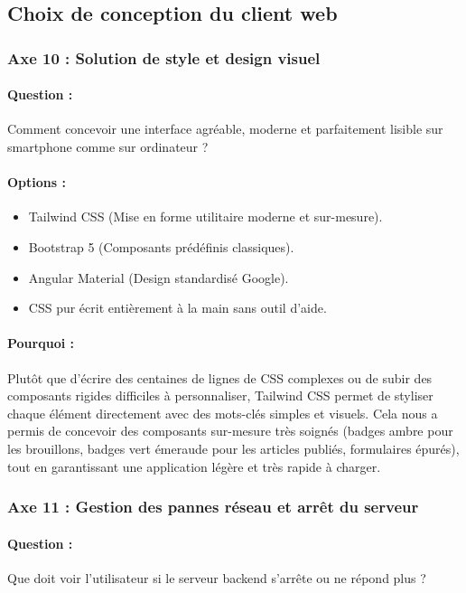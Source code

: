 \documentclass[11pt,a4paper]{article}
\begin{document}
\subsection{Choix de conception du client web}

\subsubsection{Axe 10 : Solution de style et design visuel}
\paragraph{Question :} Comment concevoir une interface agréable, moderne et parfaitement lisible sur smartphone comme sur ordinateur ?
\paragraph{Options :}
\begin{itemize}
    \item[$\boxtimes$] Tailwind CSS (Mise en forme utilitaire moderne et sur-mesure).
    \item[$\square$] Bootstrap 5 (Composants prédéfinis classiques).
    \item[$\square$] Angular Material (Design standardisé Google).
    \item[$\square$] CSS pur écrit entièrement à la main sans outil d'aide.
\end{itemize}
\paragraph{Pourquoi :} Plutôt que d'écrire des centaines de lignes de CSS complexes ou de subir des composants rigides difficiles à personnaliser, Tailwind CSS permet de styliser chaque élément directement avec des mots-clés simples et visuels. Cela nous a permis de concevoir des composants sur-mesure très soignés (badges ambre pour les brouillons, badges vert émeraude pour les articles publiés, formulaires épurés), tout en garantissant une application légère et très rapide à charger.

\subsubsection{Axe 11 : Gestion des pannes réseau et arrêt du serveur}
\paragraph{Question :} Que doit voir l'utilisateur si le serveur backend s'arrête ou ne répond plus ?
\end{document}
